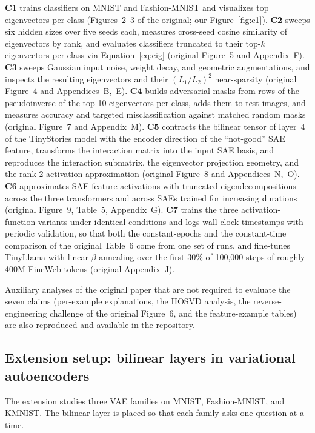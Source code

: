 \documentclass[10pt]{article} %
\begin{document}
\textbf{C1} trains classifiers on MNIST and Fashion-MNIST and visualizes top
eigenvectors per class (Figures~2--3 of the original; our Figure~\ref{fig:c1}).
\textbf{C2} sweeps six hidden sizes over five seeds each, measures cross-seed cosine
similarity of eigenvectors by rank, and evaluates classifiers truncated to their
top-$k$ eigenvectors per class via Equation~\ref{eq:eig} (original Figure~5 and
Appendix~F). \textbf{C3} sweeps Gaussian input noise, weight decay, and geometric
augmentations, and inspects the resulting eigenvectors and their $(L_1/L_2)^2$
near-sparsity (original Figure~4 and Appendices~B,~E). \textbf{C4} builds adversarial
masks from rows of the pseudoinverse of the top-10 eigenvectors per class, adds them
to test images, and measures accuracy and targeted misclassification against matched
random masks (original Figure~7 and Appendix~M). \textbf{C5} contracts the bilinear
tensor of layer~4 of the TinyStories model with the encoder direction of the
``not-good'' SAE feature, transforms the interaction matrix into the input SAE basis,
and reproduces the interaction submatrix, the eigenvector projection geometry, and
the rank-2 activation approximation (original Figure~8 and Appendices~N,~O).
\textbf{C6} approximates SAE feature activations with truncated eigendecompositions
across the three transformers and across SAEs trained for increasing durations
(original Figure~9, Table~5, Appendix~G). \textbf{C7} trains the three
activation-function variants under identical conditions and logs wall-clock
timestamps with periodic validation, so that both the constant-epochs and the
constant-time comparison of the original Table~6 come from one set of runs, and
fine-tunes TinyLlama with linear $\beta$-annealing over the first 30\% of 100{,}000
steps of roughly 400M FineWeb tokens (original Appendix~J).

Auxiliary analyses of the original paper that are not required to evaluate the seven
claims (per-example explanations, the HOSVD analysis, the reverse-engineering
challenge of the original Figure~6, and the feature-example tables) are also
reproduced and available in the repository.

\subsection{Extension setup: bilinear layers in variational autoencoders}
\label{sec:extmethod}

The extension studies three VAE families on MNIST, Fashion-MNIST, and KMNIST. The
bilinear layer is placed so that each family asks one question at a time.
\end{document}
